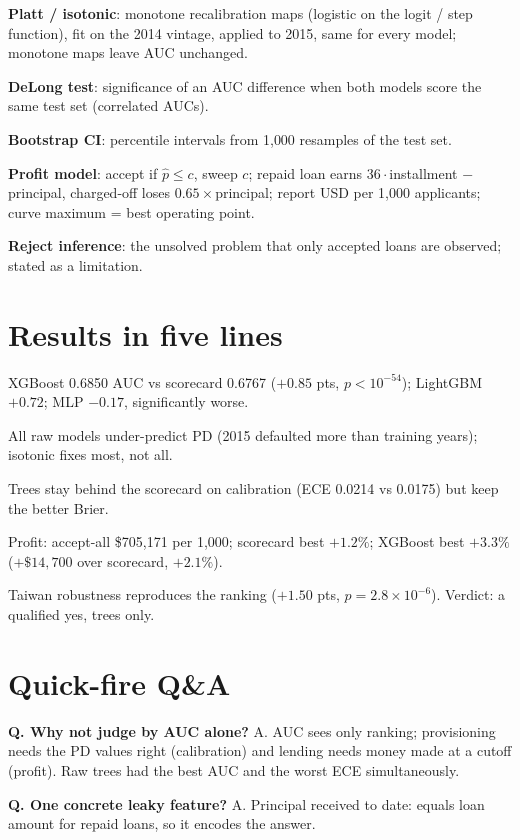 \documentclass[a4paper,10pt]{article}
\newcommand{\term}[1]{\textbf{#1}:}
\begin{document}
\term{Platt / isotonic} monotone recalibration maps (logistic on the logit / step function), fit on the 2014 vintage, applied to 2015, same for every model; monotone maps leave AUC unchanged.

\term{DeLong test} significance of an AUC difference when both models score the same test set (correlated AUCs).

\term{Bootstrap CI} percentile intervals from 1{,}000 resamples of the test set.

\term{Profit model} accept if $\hat p\le c$, sweep $c$; repaid loan earns $36\cdot$installment $-$ principal, charged-off loses $0.65\times$principal; report USD per 1{,}000 applicants; curve maximum = best operating point.

\term{Reject inference} the unsolved problem that only accepted loans are observed; stated as a limitation.

\section*{Results in five lines}

XGBoost 0.6850 AUC vs scorecard 0.6767 ($+0.85$ pts, $p<10^{-54}$); LightGBM $+0.72$; MLP $-0.17$, significantly worse.

All raw models under-predict PD (2015 defaulted more than training years); isotonic fixes most, not all.

Trees stay behind the scorecard on calibration (ECE 0.0214 vs 0.0175) but keep the better Brier.

Profit: accept-all \$705{,}171 per 1{,}000; scorecard best $+1.2\%$; XGBoost best $+3.3\%$ ($+\$14{,}700$ over scorecard, $+2.1\%$).

Taiwan robustness reproduces the ranking ($+1.50$ pts, $p=2.8\times10^{-6}$). Verdict: a qualified yes, trees only.

\section*{Quick-fire Q\&A}

\textbf{Q. Why not judge by AUC alone?} A. AUC sees only ranking; provisioning needs the PD values right (calibration) and lending needs money made at a cutoff (profit). Raw trees had the best AUC and the worst ECE simultaneously.

\textbf{Q. One concrete leaky feature?} A. Principal received to date: equals loan amount for repaid loans, so it encodes the answer.
\end{document}
